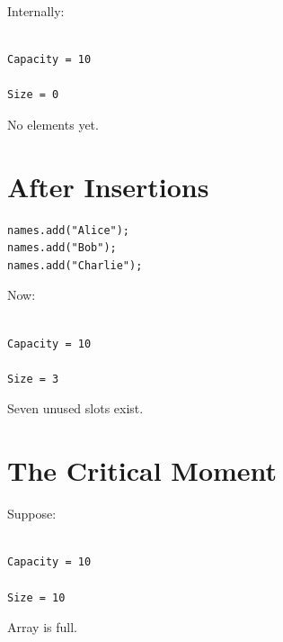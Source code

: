 \documentclass[11pt,a4paper]{book}
\begin{document}
Internally:

\begin{verbatim}

Capacity = 10

Size = 0

\end{verbatim}


No elements yet.


\section{After Insertions}

\begin{verbatim} 
names.add("Alice");
names.add("Bob");
names.add("Charlie");
\end{verbatim}


Now:

\begin{verbatim}

Capacity = 10

Size = 3

\end{verbatim}


Seven unused slots exist.


\section{The Critical Moment}

Suppose:

\begin{verbatim}

Capacity = 10

Size = 10

\end{verbatim}


Array is full.

\end{document}
